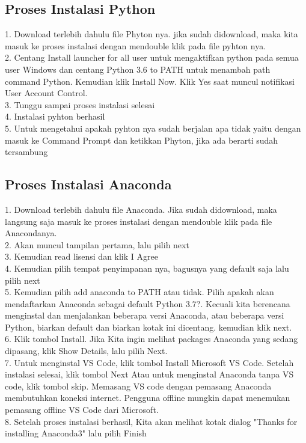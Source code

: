 \subsection{Proses Instalasi Python}
1. Download terlebih dahulu file Phyton nya. jika sudah didownload, maka kita masuk ke proses instalasi dengan mendouble klik pada file pyhton nya.\\
2. Centang Install launcher for all user untuk mengaktifkan python pada semua user Windows dan centang Python 3.6 to PATH untuk menambah path command Python. Kemudian klik Install Now. Klik Yes saat muncul notifikasi User Account Control. \\
3. Tunggu sampai proses instalasi selesai\\
4. Instalasi pyhton berhasil\\
5. Untuk mengetahui apakah pyhton nya sudah berjalan apa tidak yaitu dengan masuk ke Command Prompt dan ketikkan Phyton, jika ada berarti sudah tersambung\\

\subsection{Proses Instalasi Anaconda}
1. Download terlebih dahulu file Anaconda. Jika sudah didownload, maka langsung saja masuk ke proses instalasi dengan mendouble klik pada file Anacondanya.\\
2. Akan muncul tampilan pertama, lalu pilih next\\
3. Kemudian read lisensi dan klik I Agree\\
4. Kemudian pilih tempat penyimpanan nya, bagusnya yang default saja lalu pilih next\\
5. Kemudian pilih add anaconda to PATH atau tidak. Pilih apakah akan mendaftarkan Anaconda sebagai default Python 3.7?. Kecuali kita berencana menginstal dan menjalankan beberapa versi Anaconda, atau beberapa versi Python, biarkan default dan biarkan kotak ini dicentang. kemudian klik next.\\
6. Klik tombol Install. Jika Kita ingin melihat packages Anaconda yang sedang dipasang, klik Show Details, lalu pilih Next.\\
7. Untuk menginstal VS Code, klik tombol Install Microsoft VS Code. Setelah instalasi selesai, klik tombol Next Atau untuk menginstal Anaconda tanpa VS code, klik tombol skip. Memasang VS code dengan pemasang Anaconda membutuhkan koneksi internet. Pengguna offline mungkin dapat menemukan pemasang offline VS Code dari Microsoft.\\
8. Setelah proses instalasi berhasil, Kita akan melihat kotak dialog "Thanks for installing Anaconda3" lalu pilih Finish\\

